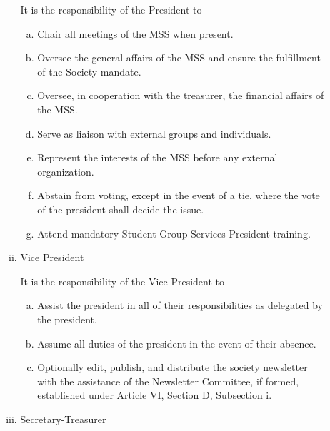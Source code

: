 \documentclass[11pt]{article}
\begin{document}
\begin{enumerate}[I.]
\begin{enumerate}[A)]
\begin{enumerate}[i)]
          It is the responsibility of the President to
            \begin{enumerate}[a)]
              \item Chair all meetings of the MSS when present.
              \item  Oversee the general affairs of the MSS and ensure the
                fulfillment of the Society mandate.
              \item Oversee, in cooperation with the treasurer, the financial
                affairs of the MSS.
              \item Serve as liaison with external groups and individuals.
              \item Represent the interests of the MSS before any external
                organization.
              \item Abstain from voting, except in the event of a tie, where
                the vote of the president shall decide the issue.
              \item Attend mandatory Student Group Services President training.

            \end{enumerate}
          \item Vice President

          It is the responsibility of the Vice President to
            \begin{enumerate}[a)]
              \item Assist the president in all of their responsibilities as
                delegated by the president.
              \item Assume all duties of the president in the event of their
                absence.
              \item Optionally edit, publish, and distribute the society
                newsletter with the assistance of the Newsletter Committee, if
                formed, established under Article VI, Section D, Subsection i.
            \end{enumerate}
          \item Secretary-Treasurer


\end{enumerate}
\end{enumerate}
\end{enumerate}
\end{document}
